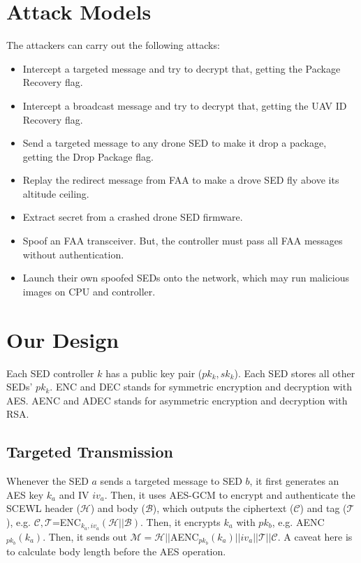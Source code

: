 \documentclass[11pt,oneside,onecolumn,letterpaper]{article}
\begin{document}
\section{Attack Models}

The attackers can carry out the following attacks:

\begin{itemize}
	\item Intercept a targeted message and try to decrypt that, getting the Package Recovery flag.

	\item Intercept a broadcast message and try to decrypt that, getting the UAV ID Recovery flag.	
	
	\item Send a targeted message to any drone SED to make it drop a package, getting the Drop Package flag.		
	
	\item Replay the redirect message from FAA to make a drove SED fly above its altitude ceiling.
	
	\item Extract secret from a crashed drone SED firmware.  
	
	\item Spoof an FAA transceiver. But, the controller must pass all FAA messages without authentication.
	
	\item Launch their own spoofed SEDs onto the network, which may run malicious images on CPU and controller.
\end{itemize}

\section{Our Design}

Each SED controller $k$ has a public key pair ($pk_k, sk_k$).
Each SED stores all other SEDs' $pk_k$.
ENC and DEC stands for symmetric encryption and decryption with AES.
AENC and ADEC stands for asymmetric encryption and decryption with RSA.

\subsection{Targeted Transmission}
Whenever the SED $a$ sends a targeted message to SED $b$, it first generates an AES key $k_a$ and IV $iv_a$. 
Then, it uses AES-GCM to encrypt and authenticate the SCEWL header ($\mathcal{H}$) and body ($\mathcal{B}$), which outputs the ciphertext ($\mathcal{C}$) and tag ($\mathcal{T}$), e.g. $\mathcal{C}, \mathcal{T}$=ENC$_{k_a, iv_a}(\mathcal{H} || \mathcal{B})$.
Then, it encrypts $k_a$ with $pk_b$, e.g. AENC$_{pk_b}(k_a)$.
Then, it sends out $\mathcal{M}=\mathcal{H} || $AENC$_{pk_b}(k_a)||iv_a||\mathcal{T}||\mathcal{C}$.
A caveat here is to calculate body length before the AES operation.
\end{document}
